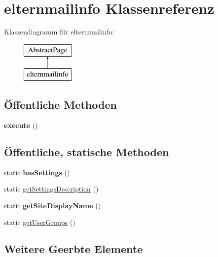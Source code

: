 \hypertarget{classelternmailinfo}{}\section{elternmailinfo Klassenreferenz}
\label{classelternmailinfo}
Klassendiagramm für elternmailinfo\+:\begin{figure}[H]
\begin{center}
\leavevmode
\includegraphics[height=2.000000cm]{classelternmailinfo}
\end{center}
\end{figure}
\subsection*{Öffentliche Methoden}
\begin{DoxyCompactItemize}
\item 
\mbox{\label{classelternmailinfo_a16c350a36bb398038dc4dc264851a48d}} 
{\bfseries execute} ()
\end{DoxyCompactItemize}
\subsection*{Öffentliche, statische Methoden}
\begin{DoxyCompactItemize}
\item 
\mbox{\label{classelternmailinfo_a43770d2ada0412c973d8d4eba7560512}} 
static {\bfseries has\+Settings} ()
\item 
static \mbox{\hyperlink{classelternmailinfo_ae70e1d4118a4e8f3572bc692ebe530d4}{get\+Settings\+Description}} ()
\item 
\mbox{\label{classelternmailinfo_ae43b6bdfe18dedb767ed3d378708d2f2}} 
static {\bfseries get\+Site\+Display\+Name} ()
\item 
static \mbox{\hyperlink{classelternmailinfo_aca08aee08bbee2942fd223f7ebc05c66}{get\+User\+Groups}} ()
\end{DoxyCompactItemize}
\subsection*{Weitere Geerbte Elemente}


